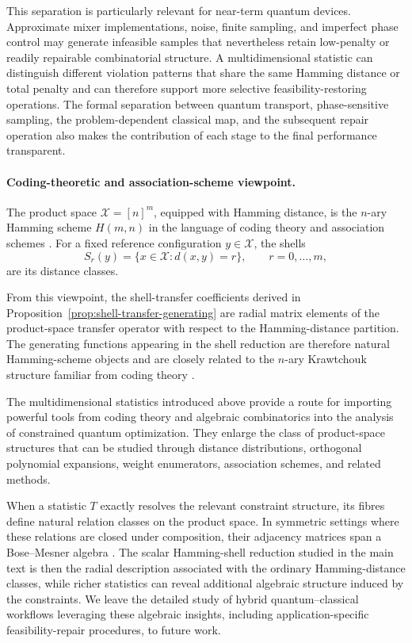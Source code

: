 \documentclass[a4paper,onecolumn,11pt,unpublished]{quantumarticle}
\theoremstyle{remark}
\begin{document}
This separation is particularly relevant for near-term quantum devices.
Approximate mixer implementations, noise, finite sampling, and imperfect
phase control may generate infeasible samples that nevertheless retain
low-penalty or readily repairable combinatorial structure. A multidimensional
statistic can distinguish different violation patterns that share the same
Hamming distance or total penalty and can therefore support more selective
feasibility-restoring operations. The formal separation between quantum
transport, phase-sensitive sampling, the problem-dependent classical map, and
the subsequent repair operation also makes the contribution of each stage to
the final performance transparent.

\paragraph{Coding-theoretic and association-scheme viewpoint.}

The product space \(\mathcal X=[n]^m\), equipped with Hamming distance, is the
\(n\)-ary Hamming scheme \(H(m,n)\) in the language of coding theory and
association schemes
\cite{MacWilliamsSloane1977,DelsarteLevenshtein1998}. For a fixed reference
configuration \(y\in \mathcal X\), the shells
\[
S_r(y)
=
\{x\in \mathcal X:d(x,y)=r\},
\qquad r=0,\ldots,m,
\]
are its distance classes.

From this viewpoint, the shell-transfer coefficients derived in
Proposition~\ref{prop:shell-transfer-generating} are radial matrix elements of
the product-space transfer operator with respect to the Hamming-distance
partition. The generating functions appearing in the shell reduction are
therefore natural Hamming-scheme objects and are closely related to the
\(n\)-ary Krawtchouk structure familiar from coding theory
\cite{MacWilliamsSloane1977}.

The multidimensional statistics introduced above provide a route for
importing powerful tools from coding theory and algebraic  combinatorics into
the analysis of constrained quantum optimization. They enlarge the class of
product-space structures that can be studied through distance distributions,
orthogonal polynomial expansions, weight enumerators, association schemes,
and related methods.

When a statistic \(T\) exactly resolves the relevant constraint structure,
its fibres define natural relation classes on the product space. In symmetric
settings where these relations are closed under composition, their adjacency
matrices span a Bose--Mesner algebra
\cite{BoseMesner1959}. The scalar Hamming-shell reduction studied in the main
text is then the radial description associated with the ordinary
Hamming-distance classes, while richer statistics can reveal additional
algebraic structure induced by the constraints. We leave the detailed study of hybrid quantum--classical workflows leveraging these algebraic insights, including application-specific feasibility-repair procedures, to future work.
\end{document}
